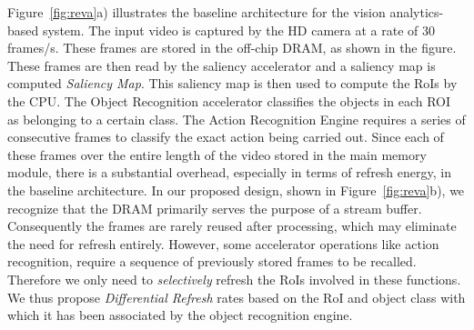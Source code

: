 
\begin{figure*}[ht!]
\begin{minipage}[b]{0.36\linewidth}
\raggedleft
{}
\caption{\label{fig:reva}a) Baseline architecture}
\end{minipage}
\addtocounter{figure}{-1}
\begin{minipage}[b]{0.37\linewidth}
\centering
{}
\caption{\label{fig:reva}b) Architecture of Proposed System}
\end{minipage}
\addtocounter{figure}{-1}
\begin{minipage}[b]{0.25\linewidth}
\raggedright
{}
\caption{\label{fig:reva}c) Design of REVA block}
\end{minipage}
\end{figure*}


Figure~\ref{fig:reva}a) illustrates the baseline architecture for the vision analytics-based system. The input video is captured by the HD camera at a rate of 30 frames/s. 
These frames are stored in the off-chip DRAM, as shown in the figure. These frames are then read by the saliency accelerator and a saliency map is computed \emph{Saliency Map}. This saliency map is then used to compute the RoIs by the CPU. The Object Recognition accelerator classifies the objects in each ROI as belonging to a certain class. The Action Recognition Engine requires a series of consecutive frames to classify the exact action being carried out. Since each of these frames over the entire length of the video stored in the main memory module, there is a substantial overhead, especially in terms of refresh energy, in the baseline architecture. In our proposed design, shown in Figure~\ref{fig:reva}b), we recognize that the DRAM primarily serves the purpose of a stream buffer. Consequently the frames are rarely reused after processing, which may eliminate the need for refresh entirely. 
However, some accelerator operations like action recognition, require a sequence of previously stored frames to be recalled. Therefore we only need to \emph{selectively} refresh the RoIs involved in these functions. We thus propose \emph{Differential Refresh} rates based on the RoI and object class with which it has been associated by the object recognition engine.

